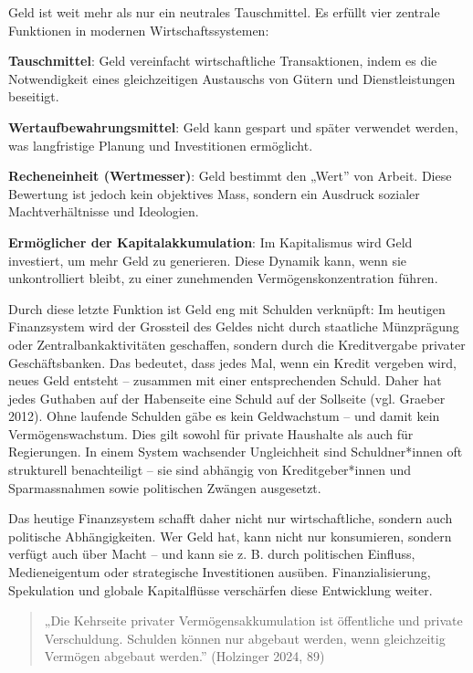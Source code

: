\documentclass[
  nswissgerman,
  a4paper,
  openany]{book}
\begin{document}
\begin{tcolorbox}[enhanced jigsaw, arc=.35mm, bottomrule=.15mm, bottomtitle=1mm, breakable, colback=white, colbacktitle=quarto-callout-note-color!10!white, colframe=quarto-callout-note-color-frame, coltitle=black, left=2mm, leftrule=.75mm, opacityback=0, opacitybacktitle=0.6, rightrule=.15mm, title={Was wir über Geld und Schulden verstehen müssen}, titlerule=0mm, toprule=.15mm, toptitle=1mm]

Geld ist weit mehr als nur ein neutrales Tauschmittel. Es erfüllt vier
zentrale Funktionen in modernen Wirtschaftssystemen:

\textbf{Tauschmittel}: Geld vereinfacht wirtschaftliche Transaktionen,
indem es die Notwendigkeit eines gleichzeitigen Austauschs von Gütern
und Dienstleistungen beseitigt.

\textbf{Wertaufbewahrungsmittel}: Geld kann gespart und später verwendet
werden, was langfristige Planung und Investitionen ermöglicht.

\textbf{Recheneinheit (Wertmesser)}: Geld bestimmt den „Wert'' von
Arbeit. Diese Bewertung ist jedoch kein objektives Mass, sondern ein
Ausdruck sozialer Machtverhältnisse und Ideologien.

\textbf{Ermöglicher der Kapitalakkumulation}: Im Kapitalismus wird Geld
investiert, um mehr Geld zu generieren. Diese Dynamik kann, wenn sie
unkontrolliert bleibt, zu einer zunehmenden Vermögenskonzentration
führen.

Durch diese letzte Funktion ist Geld eng mit Schulden verknüpft: Im
heutigen Finanzsystem wird der Grossteil des Geldes nicht durch
staatliche Münzprägung oder Zentralbankaktivitäten geschaffen, sondern
durch die Kreditvergabe privater Geschäftsbanken. Das bedeutet, dass
jedes Mal, wenn ein Kredit vergeben wird, neues Geld entsteht --
zusammen mit einer entsprechenden Schuld. Daher hat jedes Guthaben auf
der Habenseite eine Schuld auf der Sollseite (vgl. Graeber 2012). Ohne
laufende Schulden gäbe es kein Geldwachstum -- und damit kein
Vermögenswachstum. Dies gilt sowohl für private Haushalte als auch für
Regierungen. In einem System wachsender Ungleichheit sind
Schuldner*innen oft strukturell benachteiligt -- sie sind abhängig von
Kreditgeber*innen und Sparmassnahmen sowie politischen Zwängen
ausgesetzt.

Das heutige Finanzsystem schafft daher nicht nur wirtschaftliche,
sondern auch politische Abhängigkeiten. Wer Geld hat, kann nicht nur
konsumieren, sondern verfügt auch über Macht -- und kann sie z. B. durch
politischen Einfluss, Medieneigentum oder strategische Investitionen
ausüben. Finanzialisierung, Spekulation und globale Kapitalflüsse
verschärfen diese Entwicklung weiter.

\begin{quote}
„Die Kehrseite privater Vermögensakkumulation ist öffentliche und
private Verschuldung. Schulden können nur abgebaut werden, wenn
gleichzeitig Vermögen abgebaut werden.'' (Holzinger 2024, 89)
\end{quote}

\end{tcolorbox}
\end{document}
